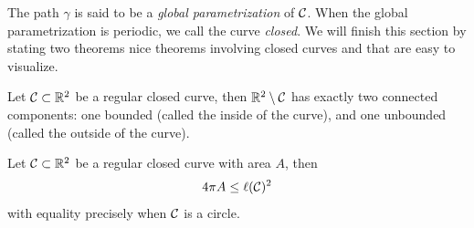 The path $\gamma$ is said to be a \textit{global parametrization} of $\mathcal{C}$. When the global parametrization is periodic, we call the curve \textit{closed}. We will finish this section by stating two theorems nice theorems involving closed curves and that are easy to visualize.

\begin{theorem}
    Let $\mathcal{C} \subset \mathbb{R}^2$ be a regular closed curve, then $\mathbb{R}^2 \setminus \mathcal{C}$ has exactly two connected components: one bounded (called the inside of the curve), and one unbounded (called the outside of the curve).
\end{theorem}

\begin{theorem}
    Let $\mathcal{C} \subset \mathbb{R}^2$ be a regular closed curve with area $A$, then
    $$4\pi A \leq \ell(\mathcal{C})^2$$
    with equality precisely when $\mathcal{C}$ is a circle.
\end{theorem}